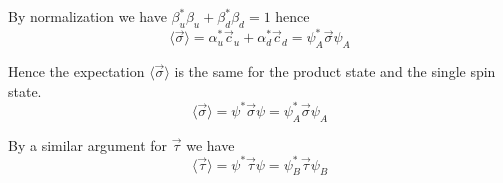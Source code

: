 \documentclass[12pt]{article}
\begin{document}
By normalization we have $\beta_u^*\beta_u+\beta_d^*\beta_d=1$ hence
\begin{equation*}
\langle\vec\sigma\rangle=\alpha_u^*\vec c_u+\alpha_d^*\vec c_d=\psi_A^*\vec\sigma\psi_A
\end{equation*}

Hence the expectation $\langle\vec\sigma\rangle$
is the same for the product state and the single spin state.
\begin{equation*}
\langle\vec\sigma\rangle=\psi^*\vec\sigma\psi=\psi_A^*\vec\sigma\psi_A
\end{equation*}

By a similar argument for $\vec\tau$ we have
\begin{equation*}
\langle\vec\tau\rangle=\psi^*\vec\tau\psi=\psi_B^*\vec\tau\psi_B
\end{equation*}
\end{document}
